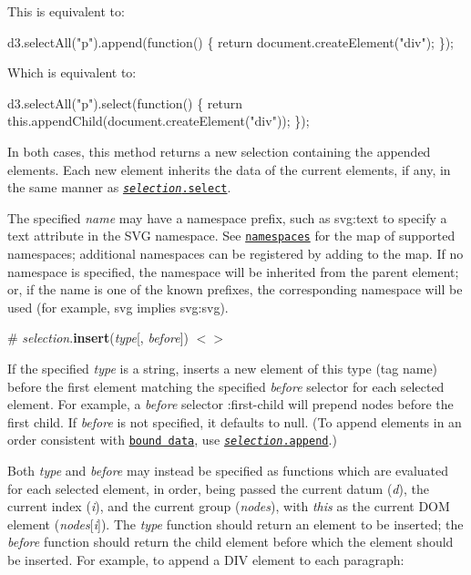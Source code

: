 This is equivalent to\+:


\begin{DoxyCode}
d3.selectAll("p").append(function() \{
  return document.createElement("div");
\});
\end{DoxyCode}


Which is equivalent to\+:


\begin{DoxyCode}
d3.selectAll("p").select(function() \{
  return this.appendChild(document.createElement("div"));
\});
\end{DoxyCode}


In both cases, this method returns a new selection containing the appended elements. Each new element inherits the data of the current elements, if any, in the same manner as \href{#selection_select}{\tt {\itshape selection}.select}.

The specified {\itshape name} may have a namespace prefix, such as {\ttfamily svg\+:text} to specify a {\ttfamily text} attribute in the S\+VG namespace. See \href{#namespaces}{\tt namespaces} for the map of supported namespaces; additional namespaces can be registered by adding to the map. If no namespace is specified, the namespace will be inherited from the parent element; or, if the name is one of the known prefixes, the corresponding namespace will be used (for example, {\ttfamily svg} implies {\ttfamily svg\+:svg}).

\label{_selection_insert}%
\# {\itshape selection}.{\bfseries insert}({\itshape type}\mbox{[}, {\itshape before}\mbox{]}) \href{https://github.com/d3/d3-selection/blob/master/src/selection/insert.js}{\tt $<$$>$}

If the specified {\itshape type} is a string, inserts a new element of this type (tag name) before the first element matching the specified {\itshape before} selector for each selected element. For example, a {\itshape before} selector {\ttfamily \+:first-\/child} will prepend nodes before the first child. If {\itshape before} is not specified, it defaults to null. (To append elements in an order consistent with \href{#joining-data}{\tt bound data}, use \href{#selection_append}{\tt {\itshape selection}.append}.)

Both {\itshape type} and {\itshape before} may instead be specified as functions which are evaluated for each selected element, in order, being passed the current datum ({\itshape d}), the current index ({\itshape i}), and the current group ({\itshape nodes}), with {\itshape this} as the current D\+OM element ({\itshape nodes}\mbox{[}{\itshape i}\mbox{]}). The {\itshape type} function should return an element to be inserted; the {\itshape before} function should return the child element before which the element should be inserted. For example, to append a D\+IV element to each paragraph\+:


